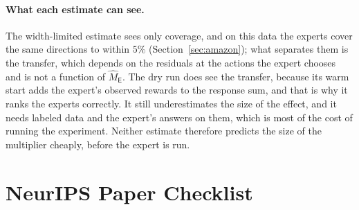\documentclass{article}
\theoremstyle{definition}
\theoremstyle{remark}
\theoremstyle{remark}
\newcommand{\Exp}{\mathsf{E}}
\begin{document}
\paragraph{What each estimate can see.} The width-limited estimate sees only
coverage, and on this data the experts cover the same directions to within
$5\%$ (Section~\ref{sec:amazon}); what separates them is the transfer, which
depends on the residuals at the actions the expert chooses and is not a
function of $\widehat M_{\Exp}$. The dry run does see the transfer, because
its warm start adds the expert's observed rewards to the response sum, and
that is why it ranks the experts correctly. It still underestimates the size
of the effect, and it needs labeled data and the expert's answers on them,
which is most of the cost of running the experiment. Neither estimate
therefore predicts the size of the multiplier cheaply, before the expert is
run.

\section*{NeurIPS Paper Checklist}
\end{document}
